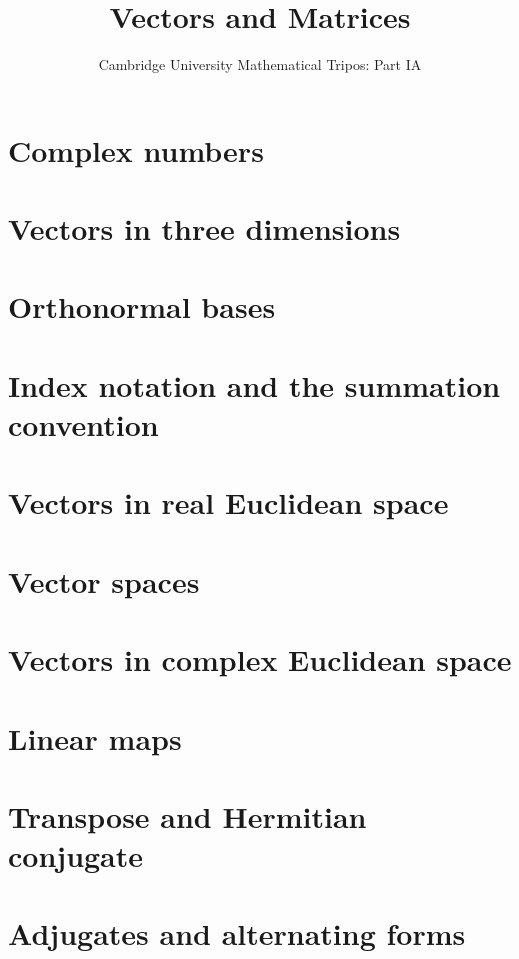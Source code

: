 \documentclass{article}
\title{Vectors and Matrices}
\author{Cambridge University Mathematical Tripos: Part IA}
\begin{document}
\maketitle

\tableofcontentsnewpage{}

\section{Complex numbers}

\section{Vectors in three dimensions}

\section{Orthonormal bases}

\section{Index notation and the summation convention}

\section{Vectors in real Euclidean space}

\section{Vector spaces}

\section{Vectors in complex Euclidean space}

\section{Linear maps}

\section{Transpose and Hermitian conjugate}

\section{Adjugates and alternating forms}

\end{document}
